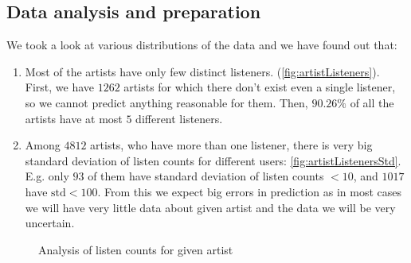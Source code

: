 \documentclass{article}
\begin{document}
\subsection*{Data analysis and preparation}
We took a look at various distributions of the data and we have found out that:
\begin{enumerate}[1.]
\item Most of the artists have only few distinct listeners. (\ref{fig:artistListeners}). First, we have $1262$ artists for which there don't exist even a single listener, so we cannot predict anything reasonable for them. Then, $90.26\%$ of all the artists have at most $5$ different listeners.
\item Among $4812$ artists, who have more than one listener, there is very big standard deviation of listen counts for different users: \ref{fig:artistListenersStd}. E.g. only $93$ of them have standard deviation of listen counts $<10$, and $1017$ have $\mbox{std} < 100$. From this we expect big errors in prediction as in most cases we will have very little data about given artist and the data we will be very uncertain.
\end{enumerate}


\begin{figure}[!h]
\center
{}
\hfill
{}

\caption{Analysis of listen counts for given artist}
\end{figure}
\end{document}
